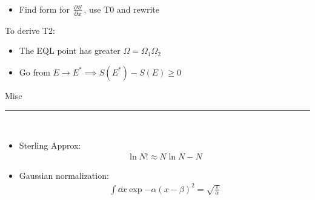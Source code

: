 \documentclass[8pt]{article}
\begin{document}
\begin{multicols*}{2}
\begin{itemize}
  \item Find form for $\pdv{S}{x}$, use T0 and rewrite 
  \end{itemize}
  To derive T2:
  \begin{itemize}
  \item The EQL point has greater $\Omega=\Omega_1\Omega_2$
  \item Go from $E\to E^*\implies S(E^*)-S(E)\geq0$
  \end{itemize}
  \begin{center}
    \large{Misc}
  \end{center}
  \hrule~\\
  \begin{itemize}
  \item Sterling Approx:
    \begin{gather*}
      \ln N!\approx N\ln N-N
    \end{gather*}
  \item Gaussian normalization:
  \begin{gather*}
    \int\dd{x}\exp{-\alpha(x-\beta)^2}=\sqrt{\frac{\pi}{\alpha}}
  \end{gather*}
  
  \end{itemize}
\end{multicols*}
\end{document}
